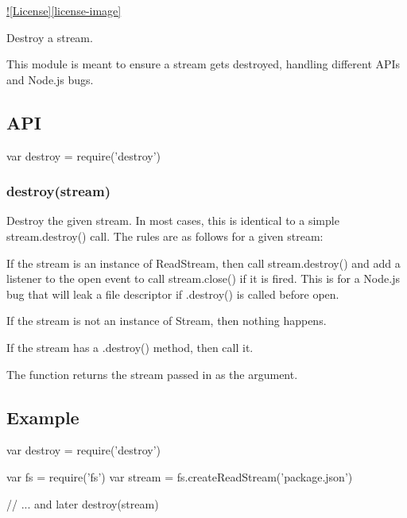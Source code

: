 \href{https://npmjs.org/package/destroy}{\tt } \href{https://travis-ci.org/stream-utils/destroy}{\tt } \href{https://coveralls.io/r/stream-utils/destroy?branch=master}{\tt } \mbox{\hyperlink{worker-farm_2_l_i_c_e_n_s_e_8md}{!\mbox{[}License\mbox{]}\mbox{[}license-\/image\mbox{]}}} \href{https://npmjs.org/package/destroy}{\tt } \href{https://www.gittip.com/jonathanong/}{\tt }

Destroy a stream.

This module is meant to ensure a stream gets destroyed, handling different A\+P\+Is and Node.\+js bugs.

\subsection*{A\+PI}


\begin{DoxyCode}
var destroy = require('destroy')
\end{DoxyCode}


\subsubsection*{destroy(stream)}

Destroy the given stream. In most cases, this is identical to a simple {\ttfamily stream.\+destroy()} call. The rules are as follows for a given stream\+:


\begin{DoxyEnumerate}
\item If the {\ttfamily stream} is an instance of {\ttfamily Read\+Stream}, then call {\ttfamily stream.\+destroy()} and add a listener to the {\ttfamily open} event to call {\ttfamily stream.\+close()} if it is fired. This is for a Node.\+js bug that will leak a file descriptor if {\ttfamily .destroy()} is called before {\ttfamily open}.
\item If the {\ttfamily stream} is not an instance of {\ttfamily Stream}, then nothing happens.
\item If the {\ttfamily stream} has a {\ttfamily .destroy()} method, then call it.
\end{DoxyEnumerate}

The function returns the {\ttfamily stream} passed in as the argument.

\subsection*{Example}


\begin{DoxyCode}
var destroy = require('destroy')

var fs = require('fs')
var stream = fs.createReadStream('package.json')

// ... and later
destroy(stream)
\end{DoxyCode}
 